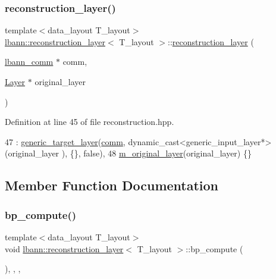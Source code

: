 \subsubsection{\texorpdfstring{reconstruction\+\_\+layer()}{reconstruction\_layer()}}
{\footnotesize\ttfamily template$<$data\+\_\+layout T\+\_\+layout$>$ \\
\hyperlink{classlbann_1_1reconstruction__layer}{lbann\+::reconstruction\+\_\+layer}$<$ T\+\_\+layout $>$\+::\hyperlink{classlbann_1_1reconstruction__layer}{reconstruction\+\_\+layer} (\begin{DoxyParamCaption}\item[{\hyperlink{classlbann_1_1lbann__comm}{lbann\+\_\+comm} $\ast$}]{comm,  }\item[{\hyperlink{classlbann_1_1Layer}{Layer} $\ast$}]{original\+\_\+layer }\end{DoxyParamCaption})\hspace{0.3cm}{\ttfamily [inline]}}



Definition at line 45 of file reconstruction.\+hpp.


\begin{DoxyCode}
47     :  \hyperlink{classlbann_1_1generic__target__layer_a9b82afdbd6bb2671b0fde30c0116ada5}{generic\_target\_layer}(\hyperlink{file__io_8cpp_ab048c6f9fcbcfaa57ce68b00263dbebe}{comm}, dynamic\_cast<generic\_input\_layer*>(original\_layer
      ), \{\}, \textcolor{keyword}{false}),
48        \hyperlink{classlbann_1_1reconstruction__layer_a077a29792de2a39015da8b18120a00e3}{m\_original\_layer}(original\_layer) \{\}
\end{DoxyCode}


\subsection{Member Function Documentation}
\mbox{\label{classlbann_1_1reconstruction__layer_a58408a14bfe5212b12243640ed284744}} 
\subsubsection{\texorpdfstring{bp\+\_\+compute()}{bp\_compute()}}
{\footnotesize\ttfamily template$<$data\+\_\+layout T\+\_\+layout$>$ \\
void \hyperlink{classlbann_1_1reconstruction__layer}{lbann\+::reconstruction\+\_\+layer}$<$ T\+\_\+layout $>$\+::bp\+\_\+compute (\begin{DoxyParamCaption}{ }\end{DoxyParamCaption})\hspace{0.3cm}{\ttfamily [inline]}, {\ttfamily [override]}, {\ttfamily [protected]}, {\ttfamily [virtual]}}

